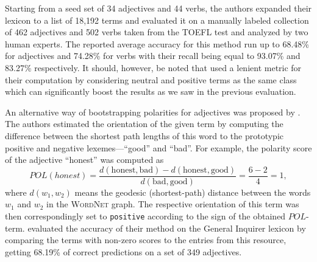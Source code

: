 Starting from a seed set of 34 adjectives and 44 verbs, the authors
expanded their lexicon to a list of 18,192 terms and evaluated it on a
manually labeled collection of 462 adjectives and 502 verbs taken from
the TOEFL test and analyzed by two human experts.  The reported
average accuracy for this method run up to 68.48\% for adjectives and
74.28\% for verbs with their recall being equal to 93.07\% and 83.27\%
respectively.  It should, however, be noted that \citet{Kim:04} used a
lenient metric for their computation by considering neutral and
positive terms as the same class which can significantly boost the
results as we saw in the previous evaluation.

An alternative way of bootstrapping polarities for adjectives was
proposed by \citet{Kamps:04}.  The authors estimated the orientation
of the given term by computing the difference between the shortest
path lengths of this word to the prototypic positive and negative
lexemes---``good'' and ``bad''.  For example, the polarity score of
the adjective ``honest'' was computed as
\begin{equation*}
  POL(honest) = \frac{d(\textrm{honest}, \textrm{bad}) - d(\textrm{honest}, \textrm{good})}%
  {d(\textrm{bad}, \textrm{good})} = \frac{6 - 2}{4} = 1,
\end{equation*}
where $d(w_1, w_2)$ means the geodesic (shortest-path) distance
between the words $w_1$ and $w_2$ in the \textsc{WordNet} graph.  The
respective orientation of this term was then correspondingly set to
\texttt{positive} according to the sign of the obtained
$POL$-term. \citet{Kamps:04} evaluated the accuracy of their method on
the General Inquirer lexicon \cite{Stone:66} by comparing the terms
with non-zero scores to the entries from this resource, getting
68.19\% of correct predictions on a set of 349 adjectives.

